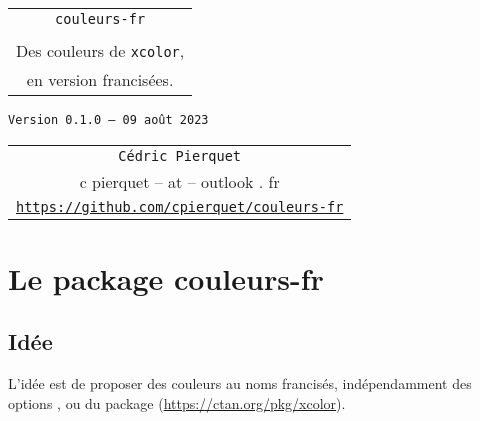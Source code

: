 \documentclass[french,11pt,a4paper]{article}
\def\TPversion{0.1.0}
\def\TPdate{09 août 2023}
\begin{document}
\pagestyle{fancy}

\thispagestyle{empty}

\begin{center}
	\begin{minipage}{0.75\linewidth}
	\begin{tcolorbox}[colframe=yellow,colback=yellow!15]
		\begin{center}
			\begin{tabular}{c}
				{\Huge \texttt{couleurs-fr}}\\
				\\
				{\LARGE Des couleurs de \texttt{xcolor},} \\
				{\LARGE en version francisées.} \\
			\end{tabular}
			
			\medskip
			
			{\small \texttt{Version \TPversion{} -- \TPdate}}
		\end{center}
	\end{tcolorbox}
\end{minipage}
\end{center}

\vspace*{2.5mm}

\begin{center}
	\begin{tabular}{c}
	\texttt{Cédric Pierquet}\\
	{\ttfamily c pierquet -- at -- outlook . fr}\\
	\texttt{\url{https://github.com/cpierquet/couleurs-fr}}
\end{tabular}
\end{center}

\vspace{2.5mm}


\hypertarget{matoc}{}

\tableofcontents

\section{Le package couleurs-fr}

\subsection{Idée}

L'idée est de proposer des couleurs au noms francisés, indépendamment des options \MontreCode{[table]}, \MontreCode{[svgnames]} ou \MontreCode{[dvipsnames]} du package  (\url{https://ctan.org/pkg/xcolor}).
\end{document}
